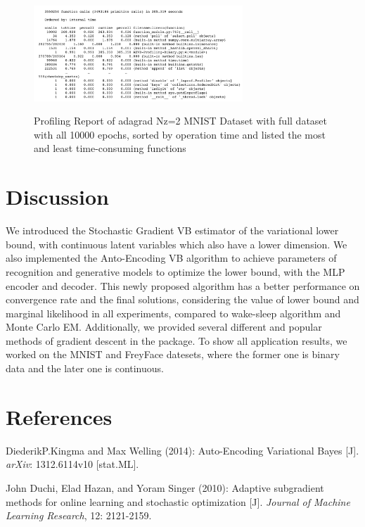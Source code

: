 \documentclass[11pt]{article}
\begin{document}
\begin{figure}[H]
\begin{center}
\includegraphics[width = 0.7\textwidth]{fig/profile1}\\
\caption{Profiling Report of adagrad Nz=2 MNIST Dataset with full dataset with all 10000 epochs, sorted by operation time and listed the most and least time-consuming functions}
\end{center}
\end{figure}



\section{Discussion}

We introduced the Stochastic Gradient VB estimator of the variational lower bound, with continuous latent variables which also have a lower dimension. We also implemented the Anto-Encoding VB algorithm to achieve parameters of recognition and generative models to optimize the lower bound, with the MLP encoder and decoder. This newly proposed algorithm has a better performance on convergence rate and the final solutions, considering the value of lower bound and marginal likelihood in all experiments, compared to wake-sleep algorithm and Monte Carlo EM. Additionally, we provided several different and popular methods of gradient descent in the package. To show all application results, we worked on the MNIST and FreyFace datesets, where the former one is binary data and the later one is continuous.


\section*{References}
\noindent
[1] DiederikP.Kingma and Max Welling (2014): Auto-Encoding Variational Bayes [J]. \textit{arXiv}: 1312.6114v10 [stat.ML].
\newline

\noindent
[2]  John Duchi, Elad Hazan, and Yoram Singer (2010): Adaptive subgradient methods for online learning and stochastic optimization [J]. \textit{Journal of Machine Learning Research}, 12: 2121-2159.
\newline
\end{document}
